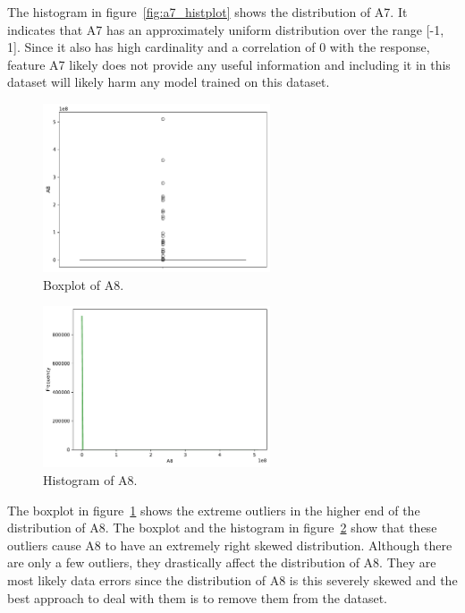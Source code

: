 \documentclass[11pt]{report}
\begin{document}
The histogram in figure~\ref{fig:a7_histplot} shows the distribution of A7. It indicates that A7 has an approximately uniform distribution over the range [-1, 1]. Since it also has high cardinality and a correlation of 0 with the response, feature A7 likely does not provide any useful information and including it in this dataset will likely harm any model trained on this dataset.

\begin{figure}[H]
    \centering
    \includegraphics[width=0.6\textwidth]{images/A8_boxplot.pdf}
    \caption{Boxplot of A8.}
    \label{fig:a8_boxplot}
\end{figure}

\begin{figure}[H]
    \centering
    \includegraphics[width=0.6\textwidth]{images/A8_histplot.pdf}
    \caption{Histogram of A8.}
    \label{fig:a8_histplot}
\end{figure}

The boxplot in figure~\ref{fig:a8_boxplot} shows the extreme outliers in the higher end of the distribution of A8. The boxplot and the histogram in figure~\ref{fig:a8_histplot} show that these outliers cause A8 to have an extremely right skewed distribution. Although there are only a few outliers, they drastically affect the distribution of A8. They are most likely data errors since the distribution of A8 is this severely skewed and the best approach to deal with them is to remove them from the dataset.
\end{document}
